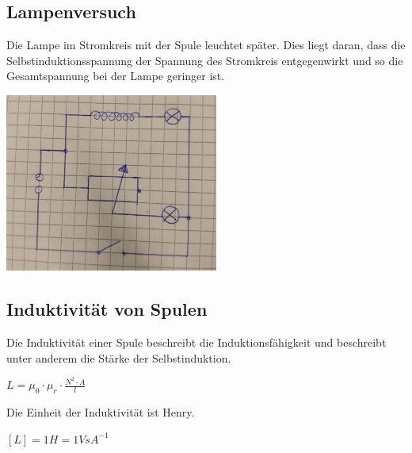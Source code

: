 \documentclass{article}
\begin{document}
\subsection*{Lampenversuch}

\begin{multicols}{2}
    Die Lampe im Stromkreis mit der Spule leuchtet später.
    Dies liegt daran, dass die Selbstinduktionsspannung der Spannung
    des Stromkreis entgegenwirkt und so die Gesamtspannung bei der Lampe
    geringer ist.


    \columnbreak

    \begin{center}
        \includegraphics[width=7cm]{./images/induktion_versuch_widerstand_laenge_haendisch.jpg}
    \end{center}

\end{multicols}

\subsection*{Induktivität von Spulen}

Die Induktivität einer Spule beschreibt die Induktionsfähigkeit und
beschreibt unter anderem die Stärke der Selbstinduktion.
\newline

\Large
$L = \mu_0 \cdot \mu_r \cdot \frac{N^2 \cdot A}{l}$
\newline

\normalsize
Die Einheit der Induktivität ist Henry.
\newline

\Large
$[L] = 1H = 1VsA^{-1}$
\end{document}
